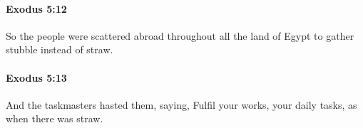 		\paragraph{Exodus 5:12} %
			\label{EXODUS-5-12}

			So the people were scattered abroad throughout all the land of Egypt to gather stubble instead of straw.


		\paragraph{Exodus 5:13} %
			\label{EXODUS-5-13}

			And the taskmasters hasted them, saying, Fulfil your works, your daily tasks, as when there was straw.


